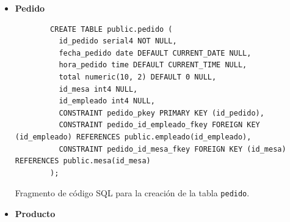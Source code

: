 \begin{itemize}
    \newpage
    \item \textbf{Pedido}
    \begin{listing}[H]
        \centering
        \begin{verbatim}
        CREATE TABLE public.pedido (
          id_pedido serial4 NOT NULL,
          fecha_pedido date DEFAULT CURRENT_DATE NULL,
          hora_pedido time DEFAULT CURRENT_TIME NULL,
          total numeric(10, 2) DEFAULT 0 NULL,
          id_mesa int4 NULL,
          id_empleado int4 NULL,
          CONSTRAINT pedido_pkey PRIMARY KEY (id_pedido),
          CONSTRAINT pedido_id_empleado_fkey FOREIGN KEY (id_empleado) REFERENCES public.empleado(id_empleado),
          CONSTRAINT pedido_id_mesa_fkey FOREIGN KEY (id_mesa) REFERENCES public.mesa(id_mesa)
        );
        \end{verbatim}
        \caption{Fragmento de código SQL para la creación de la tabla \texttt{pedido}.}
        \label{lst:pedido}
    \end{listing}
    \item \textbf{Producto}

\end{itemize}
